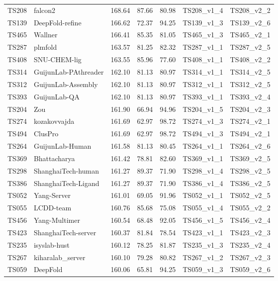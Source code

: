 \begin{longtable}{lllllll}
TS208 & falcon2 & 168.64 & 87.66 & 80.98 & TS208\_v1\_4 & TS208\_v2\_2 \\ 
TS139 & DeepFold-refine & 166.62 & 72.37 & 94.25 & TS139\_v1\_3 & TS139\_v2\_6 \\ 
TS465 & Wallner & 166.41 & 85.35 & 81.05 & TS465\_v1\_3 & TS465\_v2\_1 \\ 
TS287 & plmfold & 163.57 & 81.25 & 82.32 & TS287\_v1\_1 & TS287\_v2\_5 \\ 
TS408 & SNU-CHEM-lig & 163.55 & 85.96 & 77.60 & TS408\_v1\_1 & TS408\_v2\_2 \\ 
TS314 & GuijunLab-PAthreader & 162.10 & 81.13 & 80.97 & TS314\_v1\_1 & TS314\_v2\_5 \\ 
TS312 & GuijunLab-Assembly & 162.10 & 81.13 & 80.97 & TS312\_v1\_1 & TS312\_v2\_5 \\ 
TS393 & GuijunLab-QA & 162.10 & 81.13 & 80.97 & TS393\_v1\_1 & TS393\_v2\_4 \\ 
TS204 & Zou & 161.90 & 66.94 & 94.96 & TS204\_v1\_5 & TS204\_v2\_3 \\ 
TS274 & kozakovvajda & 161.69 & 62.97 & 98.72 & TS274\_v1\_3 & TS274\_v2\_1 \\ 
TS494 & ClusPro & 161.69 & 62.97 & 98.72 & TS494\_v1\_3 & TS494\_v2\_1 \\ 
TS264 & GuijunLab-Human & 161.58 & 81.13 & 80.45 & TS264\_v1\_1 & TS264\_v2\_6 \\ 
TS369 & Bhattacharya & 161.42 & 78.81 & 82.60 & TS369\_v1\_1 & TS369\_v2\_5 \\ 
TS298 & ShanghaiTech-human & 161.27 & 89.37 & 71.90 & TS298\_v1\_4 & TS298\_v2\_5 \\ 
TS386 & ShanghaiTech-Ligand & 161.27 & 89.37 & 71.90 & TS386\_v1\_4 & TS386\_v2\_5 \\ 
TS052 & Yang-Server & 161.01 & 69.05 & 91.96 & TS052\_v1\_1 & TS052\_v2\_5 \\ 
TS055 & LCDD-team & 160.76 & 85.68 & 75.08 & TS055\_v1\_4 & TS055\_v2\_2 \\ 
TS456 & Yang-Multimer & 160.54 & 68.48 & 92.05 & TS456\_v1\_5 & TS456\_v2\_4 \\ 
TS423 & ShanghaiTech-server & 160.37 & 81.84 & 78.54 & TS423\_v1\_1 & TS423\_v2\_3 \\ 
TS235 & isyslab-hust & 160.12 & 78.25 & 81.87 & TS235\_v1\_3 & TS235\_v2\_4 \\ 
TS267 & kiharalab\_server & 160.10 & 79.28 & 80.82 & TS267\_v1\_2 & TS267\_v2\_3 \\ 
TS059 & DeepFold & 160.06 & 65.81 & 94.25 & TS059\_v1\_3 & TS059\_v2\_6 \\ 

\end{longtable}
